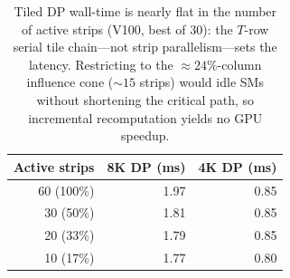 \begin{table}[h!]
\caption{Tiled DP wall-time is nearly flat in the number of active strips
(V100, best of 30): the $T$-row serial tile chain---not strip parallelism---sets
the latency. Restricting to the ${\approx}24\%$-column influence cone (${\sim}15$
strips) would idle SMs without shortening the critical path, so incremental
recomputation yields no GPU speedup.}
\label{tab:strip}
\centering
\begin{tabular}{@{}rrr@{}}
\toprule
\textbf{Active strips} & \textbf{8K DP (ms)} & \textbf{4K DP (ms)} \\
\midrule
60 (100\%) & 1.97 & 0.85 \\
30 (50\%)  & 1.81 & 0.85 \\
20 (33\%)  & 1.79 & 0.85 \\
10 (17\%)  & 1.77 & 0.80 \\
\bottomrule
\end{tabular}
\end{table}
